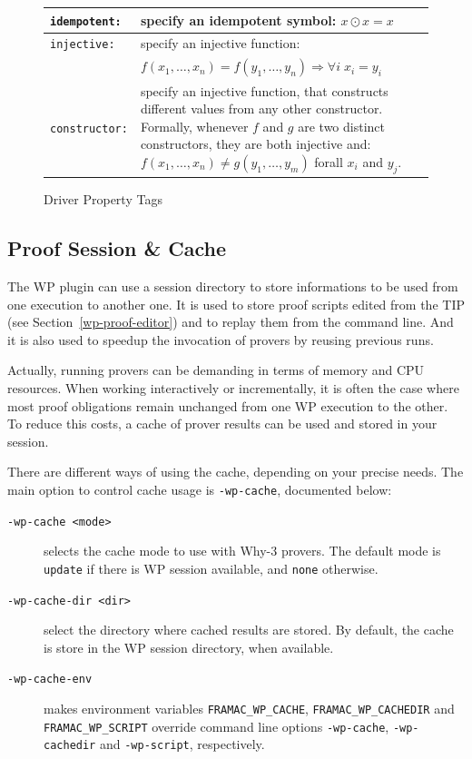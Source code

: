 \begin{figure}[htbp]
\begin{center}
\begin{tabular}{lp{10cm}}
\texttt{idempotent:} & specify an idempotent symbol: $x \odot x = x$ \\
\hline
\texttt{injective:} &  specify an injective function:\\
                      & $f(x_1,\ldots,x_n) = f(y_1,\ldots,y_n) \Longrightarrow \forall i \; x_i = y_i$ \\
\texttt{constructor:} & specify an injective function, that constructs different values
                        from any other constructor. Formally, whenever $f$ and $g$ are two
                        distinct constructors, they are both injective and:
                        $f(x_1,\ldots,x_n) \neq g(y_1,\ldots,y_m)$ forall $x_i$ and $y_j$. \\
\hline
\end{tabular}
\end{center}
\caption{Driver Property Tags}
\label{wp-driver-tags}
\end{figure}

\clearpage
\subsection{Proof Session \& Cache}
\label{wp-cache}

The \textsf{WP} plugin can use a session directory to store informations to be used from one execution to another one.
It is used to store proof scripts edited from the TIP (see Section~\ref{wp-proof-editor}) and to replay them from the command line.
And it is also used to speedup the invocation of provers by reusing previous runs.

Actually, running provers can be demanding in terms of memory and CPU resources. When working
interactively or incrementally, it is often the case where most proof obligations remain unchanged
from one \textsf{WP} execution to the other. To reduce this costs, a cache of prover results can be used
and stored in your session.

There are different ways of using the cache, depending on your precise needs.
The main option to control cache usage is \verb+-wp-cache+, documented below:

\begin{description}
\item[\tt -wp-cache <mode>] selects the cache mode to use with \textsf{Why-3}
  provers. The default mode is \verb'update' if there is \textsf{WP} session
  available, and \verb+none+ otherwise.
\item[\tt -wp-cache-dir <dir>] select the directory where cached results are
  stored. By default, the cache is store in the \textsf{WP} session
  directory, when available.
\item[\tt -wp-cache-env] makes environment variables
  \verb|FRAMAC_WP_CACHE|, \verb|FRAMAC_WP_CACHEDIR| and \verb|FRAMAC_WP_SCRIPT|
  override command line options \verb|-wp-cache|, \verb|-wp-cachedir| and \verb|-wp-script|, respectively.
\end{description}

